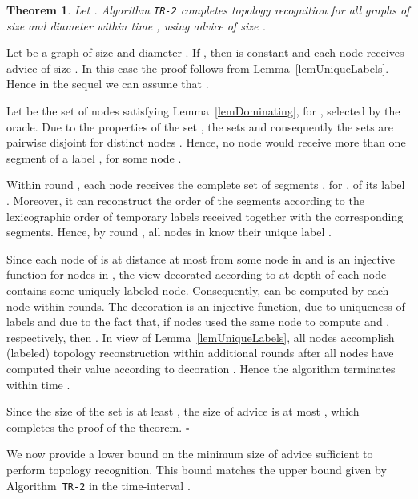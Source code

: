 \documentclass{article}
\newcommand*{\qed}{\hfill\ensuremath{\square}}
\newtheorem{theorem}{Theorem}[section]
\newenvironment{proof}{\noindent{\bf Proof:}}{\qed}
\begin{document}
\begin{theorem}\label{ubTimeD+k}
Let .
Algorithm {\tt TR-2} completes topology recognition for all graphs of size  and diameter  within time , using advice of size .
\end{theorem}
\begin{proof}
Let  be a graph of size  and diameter . If , then  is constant and each node receives advice of size . In this case the proof follows from Lemma~\ref{lemUniqueLabels}.
Hence in the sequel we can assume that .

Let  be the set of nodes satisfying Lemma~\ref{lemDominating}, for ,  selected by the oracle.
Due to the properties of the set , the sets  and consequently the sets 
are pairwise disjoint for distinct nodes .
Hence, no node would receive more than one segment of a label , for some node .

Within round , each node  receives the complete set of segments ,  for , of its label .
Moreover, it can reconstruct the order of the segments according to the lexicographic order of temporary labels  received together with the corresponding segments. 
Hence, by round , all nodes in  know their unique label .

Since each node of  is at distance at most  from some node in  and  is an injective function for nodes in , the view decorated according to  at depth  of each node contains some uniquely labeled node.
Consequently,  can be computed by each node  within  rounds.
The decoration  is an injective function, due to uniqueness of labels  and due to the fact that, if nodes  used the same node  to compute  and  , respectively, then .
In view of  Lemma~\ref{lemUniqueLabels}, all nodes accomplish (labeled) topology reconstruction within additional  rounds after all nodes have computed their value according to decoration . Hence the algorithm terminates within time .

Since the size of the set   is at least , the size of advice is at most 
, which completes the proof of the theorem.
\end{proof}

We now provide a lower bound on the minimum size of advice sufficient to perform topology recognition. This bound matches the upper bound given by Algorithm~{\tt TR-2} in the time-interval .
\end{document}

